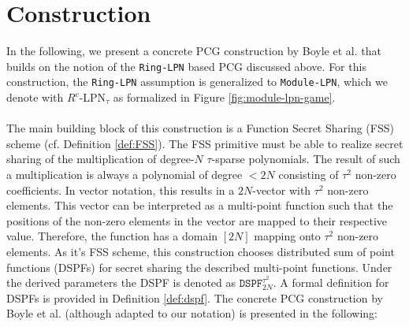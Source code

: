 \section{Construction}
\label{sec:construction}
In the following, we present a concrete PCG construction by Boyle et al. \cite{boyle2020efficient} that builds on the notion of the \texttt{Ring-LPN} based PCG discussed above. For this construction, the \texttt{Ring-LPN} assumption is generalized to \texttt{Module-LPN}, which we denote with $R^{c}$-LPN$_{\tau}$ as formalized in Figure \ref{fig:module-lpn-game}. 
\\\\
The main building block of this construction is a Function Secret Sharing (FSS) scheme (cf. Definition \ref{def:FSS}). The FSS primitive must be able to realize secret sharing of the multiplication of degree-$N$ $\tau$-sparse polynomials. The result of such a multiplication is always a polynomial of degree $< 2N$ consisting of $\tau^2$ non-zero coefficients. In vector notation, this results in a $2N$-vector with $\tau^2$ non-zero elements. This vector can be interpreted as a multi-point function such that the positions of the non-zero elements in the vector are mapped to their respective value. Therefore, the function has a domain $[2N]$ mapping onto $\tau^2$ non-zero elements. As it's FSS scheme, this construction chooses distributed sum of point functions (DSPFs) for secret sharing the described multi-point functions. Under the derived parameters the DSPF is denoted as $\texttt{DSPF}^{\tau^2}_{2N}$. A formal definition for DSPFs is provided in Definition \ref{def:dspf}. The concrete PCG construction by Boyle et al. \cite{boyle2020efficient} (although adapted to our notation) is presented in the following:

